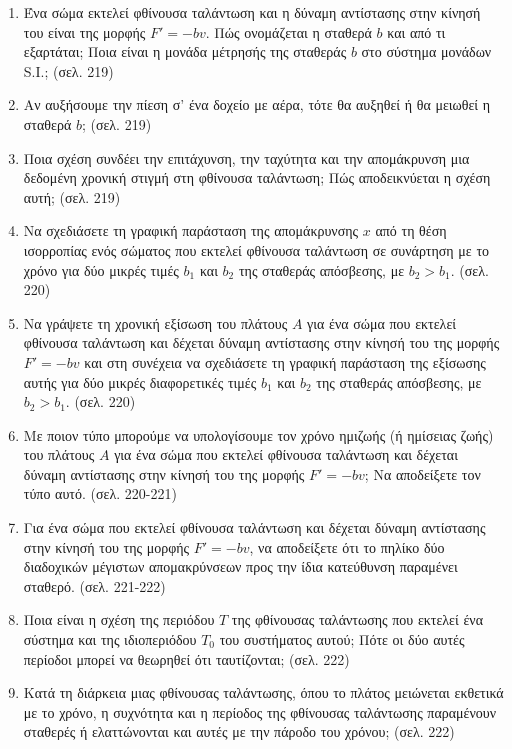 \documentclass{article}
\begin{document}
\begin{enumerate}
      \item Ένα σώμα εκτελεί φθίνουσα ταλάντωση και η δύναμη αντίστασης στην κίνησή του είναι της μορφής $F' = -bv$. Πώς ονομάζεται η σταθερά $b$ και από τι εξαρτάται; Ποια είναι η μονάδα μέτρησής της σταθεράς $b$ στο σύστημα μονάδων S.I.; (σελ. 219)

      \item Αν αυξήσουμε την πίεση σ' ένα δοχείο με αέρα, τότε θα αυξηθεί ή θα μειωθεί η σταθερά $b$; (σελ. 219)

      \item Ποια σχέση συνδέει την επιτάχυνση, την ταχύτητα και την απομάκρυνση μια δεδομένη χρονική στιγμή στη φθίνουσα ταλάντωση; Πώς αποδεικνύεται η σχέση αυτή; (σελ. 219)

      \item Να σχεδιάσετε τη γραφική παράσταση της απομάκρυνσης $x$ από τη θέση ισορροπίας ενός σώματος που εκτελεί φθίνουσα ταλάντωση σε συνάρτηση με το χρόνο για δύο μικρές τιμές $b_1$ και $b_2$ της σταθεράς απόσβεσης, με $b_2 > b_1$. (σελ. 220)

      \item Να γράψετε τη χρονική εξίσωση του πλάτους $A$ για ένα σώμα που εκτελεί φθίνουσα ταλάντωση και δέχεται δύναμη αντίστασης στην κίνησή του της μορφής $F' = -bv$ και στη συνέχεια να σχεδιάσετε τη γραφική παράσταση της εξίσωσης αυτής για δύο μικρές διαφορετικές τιμές $b_1$ και $b_2$ της σταθεράς απόσβεσης, με $b_2 > b_1$. (σελ. 220)

      \item Με ποιον τύπο μπορούμε να υπολογίσουμε τον χρόνο ημιζωής (ή ημίσειας ζωής) του πλάτους $A$ για ένα σώμα που εκτελεί φθίνουσα ταλάντωση και δέχεται δύναμη αντίστασης στην κίνησή του της μορφής $F' = -bv$; Να αποδείξετε τον τύπο αυτό. (σελ. 220-221)

      \item Για ένα σώμα που εκτελεί φθίνουσα ταλάντωση και δέχεται δύναμη αντίστασης στην κίνησή του της μορφής $F' = -bv$, να αποδείξετε ότι το πηλίκο δύο διαδοχικών μέγιστων απομακρύνσεων προς την ίδια κατεύθυνση παραμένει σταθερό. (σελ. 221-222)

      \item Ποια είναι η σχέση της περιόδου $T$ της φθίνουσας ταλάντωσης που εκτελεί ένα σύστημα και της ιδιοπεριόδου $T_0$ του συστήματος αυτού; Πότε οι δύο αυτές περίοδοι μπορεί να θεωρηθεί ότι ταυτίζονται; (σελ. 222)

      \item Κατά τη διάρκεια μιας φθίνουσας ταλάντωσης, όπου το πλάτος μειώνεται εκθετικά με το χρόνο, η συχνότητα και η περίοδος της φθίνουσας ταλάντωσης παραμένουν σταθερές ή ελαττώνονται και αυτές με την πάροδο του χρόνου; (σελ. 222)


\end{enumerate}
\end{document}
